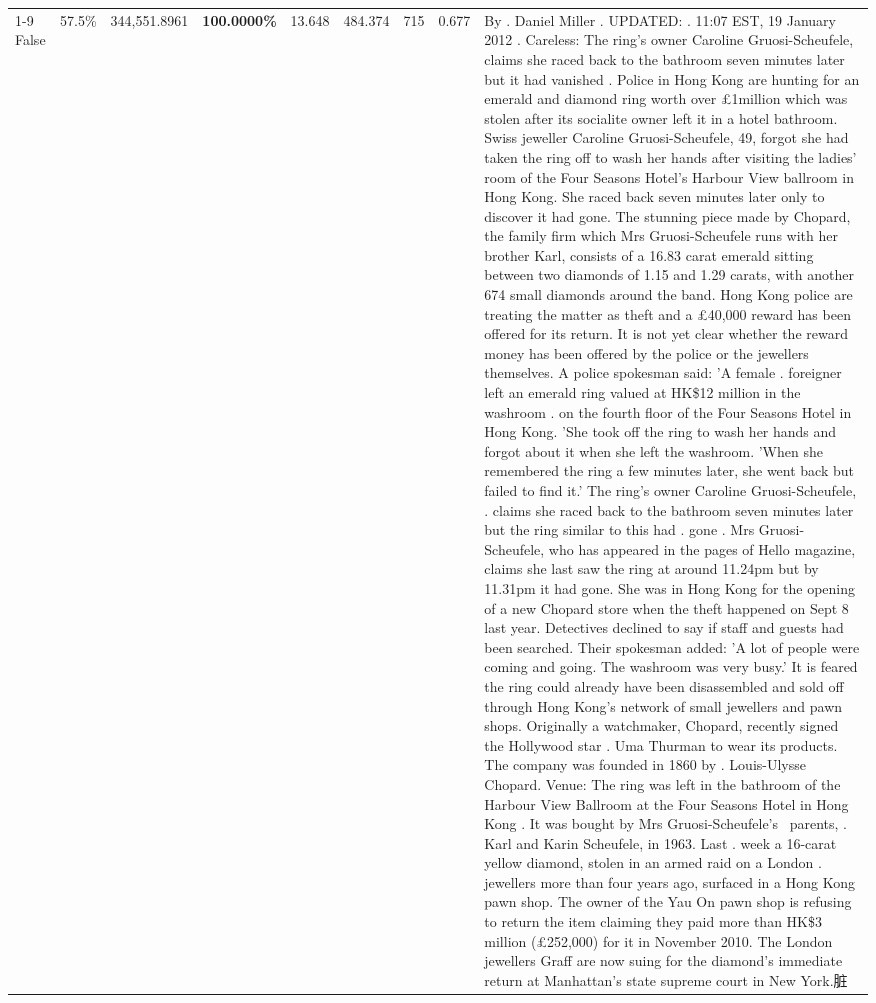 \begin{table}[H]
\begin{tabular}{lllrlllll}
\cline{1-9}
False & 57.5\% & 344,551.8961 & \bfseries \color{red} 100.0000\% & 13.648 & 484.374 & 715 & 0.677 & By . Daniel Miller . UPDATED: . 11:07 EST, 19 January 2012 . Careless: The ring's owner Caroline Gruosi-Scheufele, claims she raced back to the bathroom seven minutes later but it had vanished . Police in Hong Kong are hunting for an emerald and diamond ring worth over £1million which was stolen after its socialite owner left it in a hotel bathroom. Swiss jeweller Caroline Gruosi-Scheufele, 49, forgot she had taken the ring off to wash her hands after visiting the ladies' room of the Four Seasons Hotel's Harbour View ballroom in Hong Kong. She raced back seven minutes later only to discover it had gone. The stunning piece made by Chopard, the family firm which Mrs Gruosi-Scheufele runs with her brother Karl, consists of a 16.83 carat emerald sitting between two diamonds of 1.15 and 1.29 carats, with another 674 small diamonds around the band. Hong Kong police are treating the matter as theft and a £40,000 reward has been offered for its return. It is not yet clear whether the reward money has been offered by the police or the jewellers themselves. A police spokesman said: 'A female . foreigner left an emerald ring valued at HK\$12 million in the washroom . on the fourth floor of the Four Seasons Hotel in Hong Kong. 'She took off the ring to wash her hands and forgot about it when she left the washroom. 'When she remembered the ring a few minutes later, she went back but failed to find it.' The ring's owner Caroline Gruosi-Scheufele, . claims she raced back to the bathroom seven minutes later but the ring similar to this had . gone . Mrs Gruosi-Scheufele, who has appeared in the pages of Hello magazine, claims she last saw the ring at around 11.24pm but by 11.31pm it had gone. She was in Hong Kong for the opening of a new Chopard store when the theft happened on Sept 8 last year. Detectives declined to say if staff and guests had been searched. Their spokesman added: 'A lot of people were coming and going. The washroom was very busy.' It is feared the ring could already have been disassembled and sold off through Hong Kong's network of small jewellers and pawn shops. Originally a watchmaker, Chopard, recently signed the Hollywood star . Uma Thurman to wear its products. The company was founded in 1860 by . Louis-Ulysse Chopard. Venue: The ring was left in the bathroom of the Harbour View Ballroom at the Four Seasons Hotel in Hong Kong . It was bought by Mrs Gruosi-Scheufele's  parents, . Karl and Karin Scheufele, in 1963. Last . week a 16-carat yellow diamond, stolen in an armed raid on a London . jewellers more than four years ago, surfaced in a Hong Kong pawn shop. The owner of the Yau On pawn shop is refusing to return the item claiming they paid more than HK\$3 million (£252,000) for it in November 2010. The London jewellers Graff are now suing for the diamond’s immediate return at Manhattan’s state supreme court in New York.脏 \\

\end{tabular}
\end{table}
